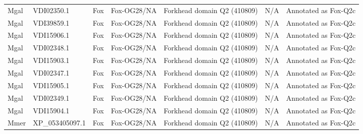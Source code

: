 \documentclass[../main.tex]{subfiles}
\begin{document}
\begin{landscape}
\begin{longtable}{lllllll}
		Mgal           & VDI02350.1            & Fox            & Fox-OG28/NA         & Forkhead domain Q2 (410809)                 & N/A                                                                    & Annotated as Fox-Q2c \\
		Mgal           & VDI39859.1            & Fox            & Fox-OG28/NA         & Forkhead domain Q2 (410809)                 & N/A                                                                    & Annotated as Fox-Q2c \\
		Mgal           & VDI15906.1            & Fox            & Fox-OG28/NA         & Forkhead domain Q2 (410809)                 & N/A                                                                    & Annotated as Fox-Q2c \\
		Mgal           & VDI02348.1            & Fox            & Fox-OG28/NA         & Forkhead domain Q2 (410809)                 & N/A                                                                    & Annotated as Fox-Q2c \\
		Mgal           & VDI15903.1            & Fox            & Fox-OG28/NA         & Forkhead domain Q2 (410809)                 & N/A                                                                    & Annotated as Fox-Q2c \\
		Mgal           & VDI02347.1            & Fox            & Fox-OG28/NA         & Forkhead domain Q2 (410809)                 & N/A                                                                    & Annotated as Fox-Q2c \\
		Mgal           & VDI15905.1            & Fox            & Fox-OG28/NA         & Forkhead domain Q2 (410809)                 & N/A                                                                    & Annotated as Fox-Q2c \\
		Mgal           & VDI02349.1            & Fox            & Fox-OG28/NA         & Forkhead domain Q2 (410809)                 & N/A                                                                    & Annotated as Fox-Q2c \\
		Mgal           & VDI15904.1            & Fox            & Fox-OG28/NA         & Forkhead domain Q2 (410809)                 & N/A                                                                    & Annotated as Fox-Q2c \\
		Mmer           & XP\_053405097.1       & Fox            & Fox-OG28/NA         & Forkhead domain Q2 (410809)                 & N/A                                                                    & Annotated as Fox-Q2c \\

\end{longtable}
\end{landscape}
\end{document}
